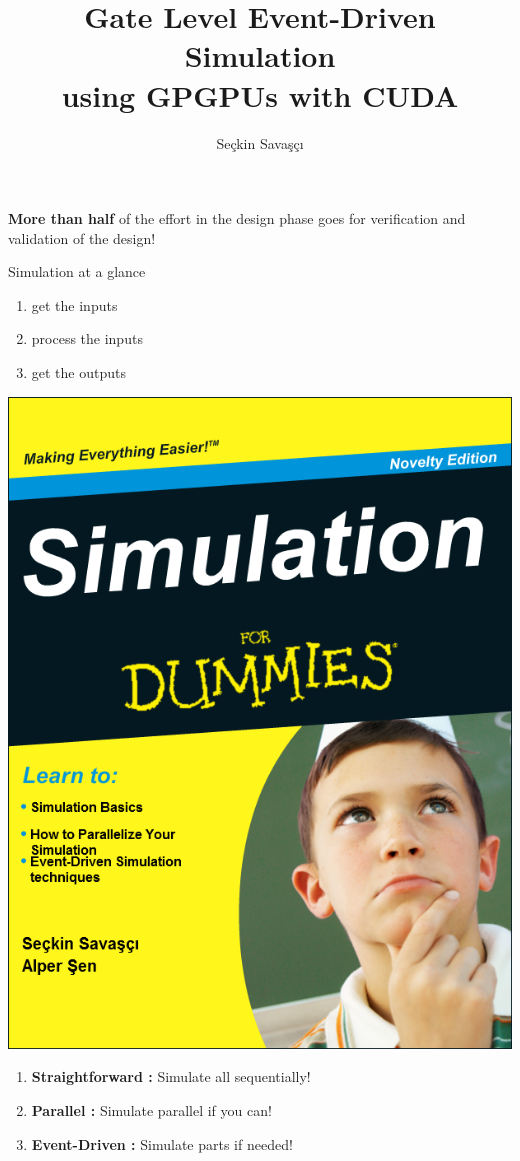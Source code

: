 \documentclass[aspectratio=1610]{beamer}
\title{Gate Level Event-Driven Simulation \\ using GPGPUs with CUDA}
\author{Se\c{c}kin Sava\c{s}\c{c}\i}
\institute{Bogazici University \\ Senior Project - CMPE492}
\begin{document}
\begin{frame}
\titlepage
\end{frame}

\begin{frame}
\LARGE\centering \textbf{More than half} of the effort in the design phase goes for verification and validation of the design! \\ 
\end{frame}


\begin{frame}{Simulation at a glance}
\LARGE
\begin{enumerate}
\item get the inputs
\item process the inputs
\item get the outputs
\end{enumerate}
\end{frame}


\begin{frame}

\centering 
\includegraphics[height=0.75\textheight]{simfd.png}

\begin{enumerate}
\item \textbf{Straightforward :} Simulate all sequentially!
\item \textbf{Parallel :} Simulate parallel if you can!
\item \textbf{Event-Driven : } Simulate parts if needed! 
\end{enumerate}
\end{frame}
\end{document}
